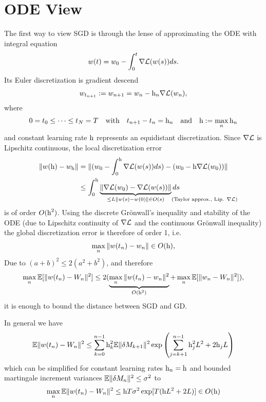 \section{ODE View}

The first way to view SGD is through the lense of approximating the ODE with
integral equation
\begin{align*}
	w(t) =  w_0 -\int_{0}^{t}\nabla\mathcal{L}(w(s))ds.
\end{align*}
Its Euler discretization is gradient descend 
\begin{align*}
	w_{t_{n+1}}:=w_{n+1}
	= w_n - \text{h}_n \nabla\mathcal{L}(w_n),
\end{align*}
where
\begin{align*}
	0=t_0 \le \dots \le t_N= T \quad \text{with} \quad t_{n+1}-t_n=\text{h}_n
	\quad \text{and}\quad \text{h}:=\max_n \text{h}_n
\end{align*}
and constant learning rate \(\text{h}\) represents an equidistant discretization.
Since \(\nabla\mathcal{L}\) is Lipschitz continuous, the local discretization error
\begin{align*}
	\|\weights(\lr)  - \weights_\lr \|
	&= \|(\weights_0 - \int_0^\lr\nabla\Loss(\weights(s))ds) - (\weights_0-\lr\nabla\Loss(\weights_0))\|\\
	&\le  \int_0^\lr \underbrace{\|\nabla\Loss(\weights_0) - \nabla\Loss(\weights(s))\|}_{
		\le \ubound \|\weights(s) - \weights(0)\| \in O(s) \mathrlap{\quad\text{(Taylor approx., Lip. \(\nabla\Loss\))}}
	}ds 
\end{align*}
is of order \(O(\text{h}^2)\). 
Using the discrete Gr\"onwall's inequality and stability of the ODE (due to Lipschitz continuity of
\(\nabla\mathcal{L}\) and the continuous Gr\"onwall inequality) the global discretization
error is therefore of order 1, i.e.
\begin{align*}
	\max_{n} \|w(t_n) - w_n\| \in O(\text{h}),
\end{align*}
Due to \((a+b)^2\le2(a^2+b^2)\), and therefore 
\begin{align*}
	\max_n\mathbb{E}[\|w(t_n)-W_n\|^2]
	\le 2(\underbrace{\max_n \|w(t_n)-w_n\|^2}_{O(\text{h}^2)}
	+\max_{n}\mathbb{E}[\|w_n - W_n\|^2]),
\end{align*}
it is enough to bound the distance between SGD and GD.
\begin{theorem}\label{thm: distance SGD vs GD}
	In general we have
	\begin{align*}
		\mathbb{E}\|w(t_n)-W_n\|^2
		\le \sum_{k=0}^{n-1}\text{h}_k^2\mathbb{E}\|\delta M_{k+1}\|^2\exp\left(
			\sum_{j=k+1}^{n-1}\text{h}_j^2L^2 + 2\text{h}_jL
		\right)
	\end{align*}
	which can be simplified for constant learning rates \(\text{h}_n=\text{h}\) and bounded
	martingale increment variances \(\mathbb{E}\|\delta M_n\|^2 \le \sigma^2\) to
	\begin{align*}
		\max_{n}\mathbb{E}\|w(t_n)	-W_n\|^2
		\le \text{h} T\sigma^2\exp[T(\text{h}L^2 + 2L)] \in O(\text{h})
	\end{align*}
\end{theorem}
